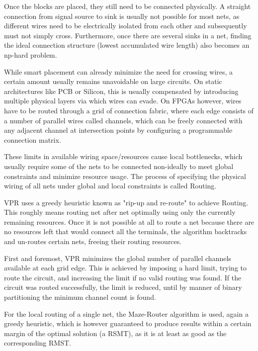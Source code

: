 Once the blocks are placed, they still need to be connected physically. A straight connection from signal source to sink is usually not possible for most nets, as different wires need to be electrically isolated from each other and subsequently must not simply cross. Furthermore, once there are several sinks in a net, finding the ideal connection structure (lowest accumulated wire length) also becomes an np-hard problem\cite{rsmt-complexity}.

While smart placement can already minimize the need for crossing wires, a certain amount usually remains unavoidable on large circuits. On static architectures like \gls{PCB} or Silicon, this is usually compensated by introducing multiple physical layers via which wires can evade. On \glspl{FPGA} however, wires have to be routed through a grid of connection fabric, where each edge consists of a number of parallel wires called channels, which can be freely connected with any adjacent channel at intersection points by configuring a programmable connection matrix.

These limits in available wiring space/resources cause local bottlenecks, which usually require some of the nets to be connected non-ideally to meet global constraints and minimize resource usage. The process of specifying the physical wiring of all nets under global and local constraints is called Routing.

\gls{VPR} uses a greedy heuristic known as "rip-up and re-route" to achieve Routing. This roughly means routing net after net optimally using only the currently remaining resources. Once it is not possible at all to route a net because there are no resources left that would connect all the terminals, the algorithm backtracks and un-routes certain nets, freeing their routing resources\cite{vtr8}.

First and foremost, \gls{VPR} minimizes the global number of parallel channels available at each grid edge. This is achieved by imposing a hard limit, trying to route the circuit, and increasing the limit if no valid routing was found. If the circuit was routed successfully, the limit is reduced, until by manner of binary partitioning the minimum channel count is found.

For the local routing of a single net, the Maze-Router\cite{Maze-Router} algorithm is used, again a greedy heuristic, which is however guaranteed to produce results within a certain margin of the optimal solution (a \gls{RSMT}), as it is at least as good as the corresponding \gls{RMST}\cite{rmst-quality}.

